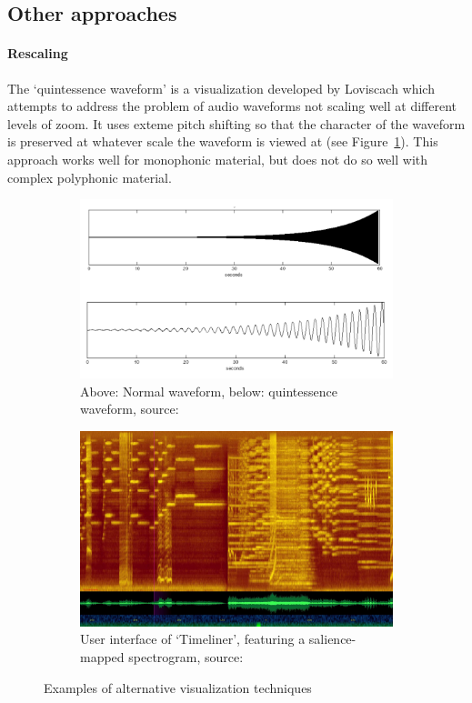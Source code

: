 \subsection{Other approaches}

\paragraph{Rescaling}
The `quintessence waveform' is a visualization developed by Loviscach
\citep{Loviscach2011} which attempts to address the problem of audio waveforms
not scaling well at different levels of zoom. It uses exteme pitch shifting so
that the character of the waveform is preserved at whatever scale the waveform
is viewed at (see Figure~\ref{fig:quint}). This approach works well for
monophonic material, but does not do so well with complex polyphonic material.

\begin{figure}[ht]
\centering
\begin{subfigure}{.5\textwidth}
  \centering
  \includegraphics[width=0.95\linewidth]{figs/quint.png}
  \caption{Above: Normal waveform, below: quintessence waveform, source:
  \citep{Loviscach2011}}
  \label{fig:quint}
\end{subfigure}%
\begin{subfigure}{.5\textwidth}
  \centering
  \includegraphics[width=0.95\linewidth]{figs/timeliner.png}
  \caption{User interface of `Timeliner', featuring a salience-mapped
    spectrogram, source: \citep{Goudeseune2012}}
  \label{fig:timeliner}
\end{subfigure}
  \caption{Examples of alternative visualization techniques}
\label{fig:altvis}
\end{figure}

